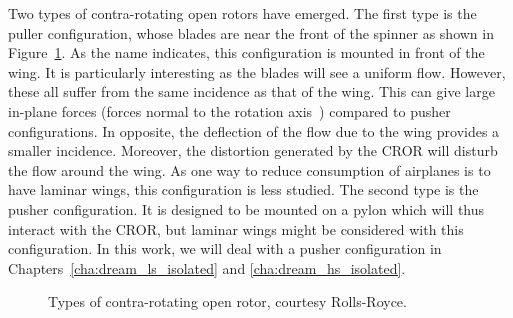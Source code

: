 Two types of contra-rotating open rotors have emerged. The first
type is the puller configuration, whose blades 
are near the front of the spinner as 
shown in Figure~\ref{fig:cror_configurations}. As the
name indicates, this configuration is mounted in front of the
wing. It is particularly interesting as the blades will see
a uniform flow. However, these all suffer from the same incidence as that
of the wing. This can give large in-plane forces 
(forces normal to the rotation axis~\cite{ThesisFrancois}) compared to pusher
configurations. In opposite, the deflection of the flow due to the wing provides
a smaller incidence.
Moreover, the distortion generated
by the CROR will disturb the flow around the wing. As one way to reduce
consumption of airplanes is to have laminar wings, this configuration
is less studied. The second type is the pusher
configuration. It is designed to be mounted on a pylon which will thus
interact with the CROR, but laminar wings might be considered with
this configuration. In this work, we will deal with a pusher configuration
in Chapters~\ref{cha:dream_ls_isolated} and
\ref{cha:dream_hs_isolated}.
\begin{figure}[htp]
  \centering
  \caption{Types of contra-rotating open rotor, courtesy Rolls-Royce.}
  \label{fig:cror_configurations}
\end{figure}

